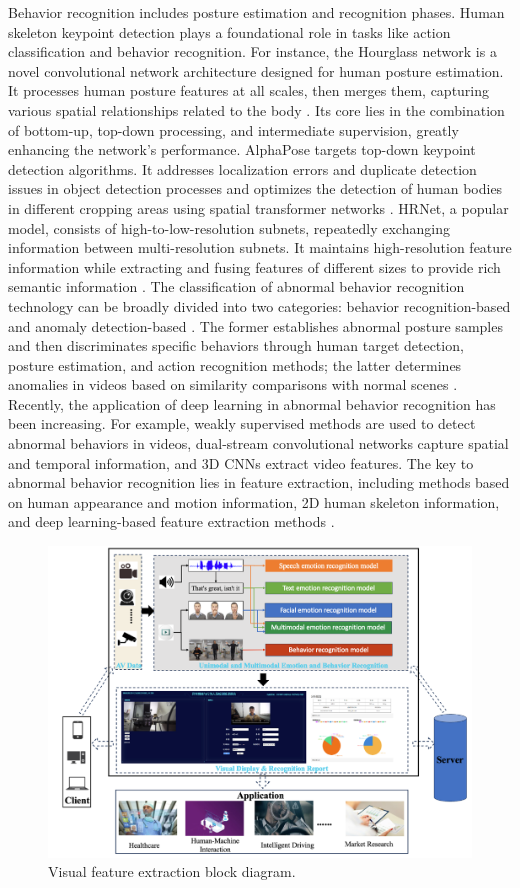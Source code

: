 \documentclass[preprint,12pt]{elsarticle}
\begin{document}
Behavior recognition includes posture estimation and recognition phases. Human skeleton keypoint detection plays a foundational role in tasks like action classification and behavior recognition. For instance, the Hourglass network is a novel convolutional network architecture designed for human posture estimation. It processes human posture features at all scales, then merges them, capturing various spatial relationships related to the body \cite{ref26}. Its core lies in the combination of bottom-up, top-down processing, and intermediate supervision, greatly enhancing the network's performance. AlphaPose targets top-down keypoint detection algorithms. It addresses localization errors and duplicate detection issues in object detection processes and optimizes the detection of human bodies in different cropping areas using spatial transformer networks \cite{ref27}. HRNet, a popular model, consists of high-to-low-resolution subnets, repeatedly exchanging information between multi-resolution subnets. It maintains high-resolution feature information while extracting and fusing features of different sizes to provide rich semantic information \cite{ref28}. The classification of abnormal behavior recognition technology can be broadly divided into two categories: behavior recognition-based and anomaly detection-based \cite{ref29}. The former establishes abnormal posture samples and then discriminates specific behaviors through human target detection, posture estimation, and action recognition methods; the latter determines anomalies in videos based on similarity comparisons with normal scenes \cite{ref30}. Recently, the application of deep learning in abnormal behavior recognition has been increasing. For example, weakly supervised methods are used to detect abnormal behaviors in videos, dual-stream convolutional networks capture spatial and temporal information, and 3D CNNs extract video features. The key to abnormal behavior recognition lies in feature extraction, including methods based on human appearance and motion information, 2D human skeleton information, and deep learning-based feature extraction methods \cite{ref31, ref32}.
\begin{figure}[h]%
\centering
\includegraphics[width=1\textwidth]{Fig1.png}
\caption{Visual feature extraction block diagram.}\label{fig1}
\end{figure}
\end{document}
